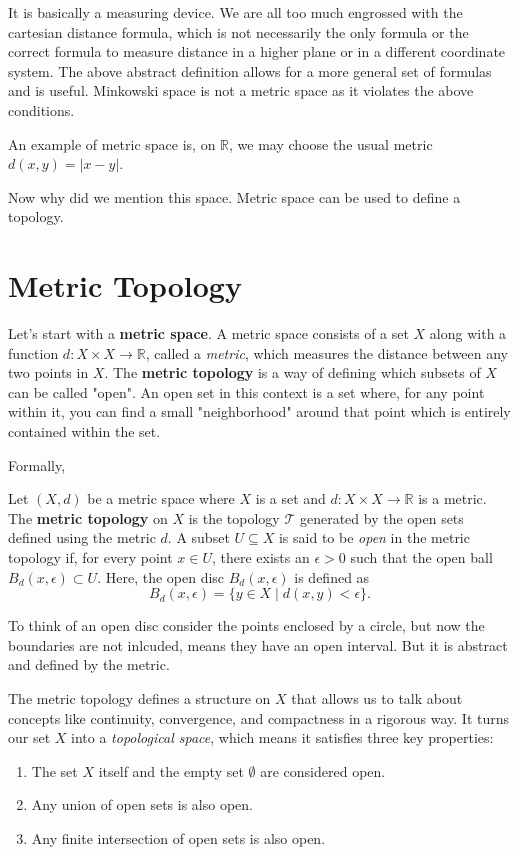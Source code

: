 \documentclass{article}
\begin{document}
It is basically a measuring device. We are all too much engrossed with the cartesian distance formula, which is not necessarily the only formula or the correct formula to measure distance in a higher plane or in a different coordinate system. The above abstract definition allows for a more general set of formulas and is useful. Minkowski space is not a metric space as it violates the above conditions. 

An example of metric space is, on $\mathbb{R}$, we may choose the usual metric $d(x, y) = |x - y|$.     


Now why did we mention this space. Metric space can be used to define a topology. 

\section*{Metric Topology}

Let's start with a \textbf{metric space}. A metric space consists of a set $X$ along with a function $d: X \times X \to \mathbb{R}$, called a \emph{metric}, which measures the distance between any two points in $X$. The \textbf{metric topology} is a way of defining which subsets of $X$ can be called "open". An open set in this context is a set where, for any point within it, you can find a small "neighborhood" around that point which is entirely contained within the set. 

Formally, 

\begin{theorem} 
Let $(X, d)$ be a metric space where $X$ is a set and $d: X \times X \to \mathbb{R}$ is a metric. The \textbf{metric topology} on $X$ is the topology $\mathcal{T}$ generated by the open sets defined using the metric $d$. A subset $U \subseteq X$ is said to be \emph{open} in the metric topology if, for every point $x \in U$, there exists an $\epsilon > 0$ such that the open ball $B_d(x, \epsilon) \subset U$. Here, the open disc $B_d(x, \epsilon)$ is defined as
\[
B_d(x, \epsilon) = \{ y \in X \mid d(x, y) < \epsilon \}.
\]

\end{theorem}

To think of an open disc consider the points enclosed by a circle, but now the boundaries are not inlcuded, means they have an open interval. But it is abstract and defined by the metric. 

The metric topology defines a structure on $X$ that allows us to talk about concepts like continuity, convergence, and compactness in a rigorous way. It turns our set $X$ into a \emph{topological space}, which means it satisfies three key properties:
\begin{enumerate}
    \item The set $X$ itself and the empty set $\emptyset$ are considered open.
    \item Any union of open sets is also open.
    \item Any finite intersection of open sets is also open.
\end{enumerate} 
\end{document}
